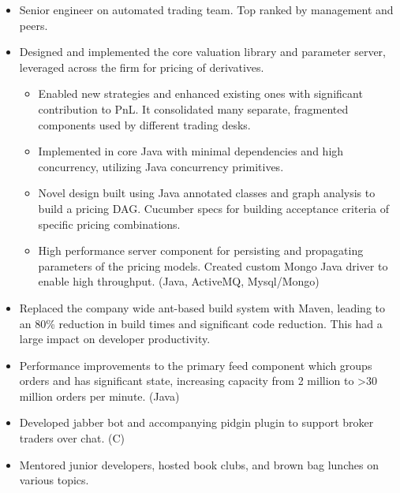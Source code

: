 \documentclass[11pt,a4paper,roman]{moderncv}
\begin{document}
\vspace{5mm}

\begin{itemize}
\item Senior engineer on automated trading team. Top ranked by management and peers.
\item Designed and implemented the core valuation library and parameter server, leveraged across the firm for pricing of derivatives.
  \begin{itemize}
    \item Enabled new strategies and enhanced existing ones with significant contribution to PnL. It
          consolidated many separate, fragmented components used by different trading desks.
    \item Implemented in core Java with minimal dependencies and high concurrency, utilizing Java
          concurrency primitives.
    \item Novel design built using Java annotated classes and graph analysis to build a pricing DAG.\@
          Cucumber specs for building acceptance criteria of specific pricing combinations.
    \item High performance server component for persisting and propagating parameters of the pricing models.
          Created custom Mongo Java driver to enable high throughput. (Java, ActiveMQ, Mysql/Mongo)
  \end{itemize}
  \item Replaced the company wide ant-based build system with Maven, leading to an 80\%
        reduction in build times and significant code reduction. This had a large impact on developer
        productivity.
  \item Performance improvements to the primary feed component which groups orders and has significant
        state, increasing capacity from 2 million to \textgreater{}30 million orders per minute. (Java)
\item Developed jabber bot and accompanying pidgin plugin to support broker traders over chat. (C)
\item Mentored junior developers, hosted book clubs, and brown bag lunches on various topics.
\end{itemize}

\vspace{5mm}
\end{document}
